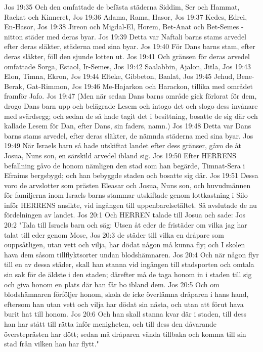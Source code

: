 Jos 19:35  Och den omfattade de befästa städerna Siddim, Ser och Hammat, Rackat och Kinneret,
Jos 19:36  Adama, Rama, Hasor,
Jos 19:37  Kedes, Edrei, En-Hasor,
Jos 19:38  Jireon och Migdal-El, Horem, Bet-Anat och Bet-Semes - nitton städer med deras byar.
Jos 19:39  Detta var Naftali barns stams arvedel efter deras släkter, städerna med sina byar.
Jos 19:40  För Dans barns stam, efter deras släkter, föll den sjunde lotten ut.
Jos 19:41  Och gränsen för deras arvedel omfattade Sorga, Estaol, Ir-Semes,
Jos 19:42  Saalabbin, Ajalon, Jitla,
Jos 19:43  Elon, Timna, Ekron,
Jos 19:44  Elteke, Gibbeton, Baalat,
Jos 19:45  Jehud, Bene-Berak, Gat-Rimmon,
Jos 19:46  Me-Hajarkon och Harackon, tillika med området framför Jafo.
Jos 19:47  (Men när sedan Dans barns område gick förlorat för dem, drogo Dans barn upp och belägrade Lesem och intogo det och slogo dess invånare med svärdsegg; och sedan de så hade tagit det i besittning, bosatte de sig där och kallade Lesem för Dan, efter Dans, sin faders, namn.)
Jos 19:48  Detta var Dans barns stams arvedel, efter deras släkter, de nämnda städerna med sina byar.
Jos 19:49  När Israels barn så hade utskiftat landet efter dess gränser, gåvo de åt Josua, Nuns son, en särskild arvedel ibland sig.
Jos 19:50  Efter HERRENS befallning gåvo de honom nämligen den stad som han begärde, Timnat-Sera i Efraims bergsbygd; och han bebyggde staden och bosatte sig där.
Jos 19:51  Dessa voro de arvslotter som prästen Eleasar och Josua, Nuns son, och huvudmännen för familjerna inom Israels barns stammar utskiftade genom lottkastning i Silo inför HERRENS ansikte, vid ingången till uppenbarelsetältet. Så avslutade de nu fördelningen av landet.
Jos 20:1  Och HERREN talade till Josua och sade:
Jos 20:2  "Tala till Israels barn och säg: Utsen åt eder de fristäder om vilka jag har talat till eder genom Mose,
Jos 20:3  de städer till vilka en dråpare som ouppsåtligen, utan vett och vilja, har dödat någon må kunna fly; och I skolen hava dem såsom tillflyktsorter undan blodshämnaren.
Jos 20:4  Och när någon flyr till en av dessa städer, skall han stanna vid ingången till stadsporten och omtala sin sak för de äldste i den staden; därefter må de taga honom in i staden till sig och giva honom en plats där han får bo ibland dem.
Jos 20:5  Och om blodshämnaren förföljer honom, skola de icke överlämna dråparen i hans hand, eftersom han utan vett och vilja har dödat sin nästa, och utan att förut hava burit hat till honom.
Jos 20:6  Och han skall stanna kvar där i staden, till dess han har stått till rätta inför menigheten, och till dess den dåvarande översteprästen har dött; sedan må dråparen vända tillbaka och komma till sin stad från vilken han har flytt."
